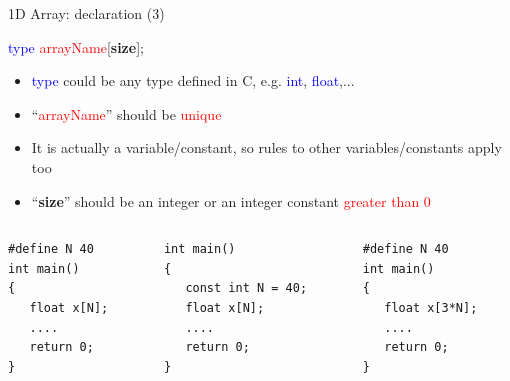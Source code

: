 \begin{frame}[fragile]{1D Array: declaration (3)}
\begin{center}
 \LARGE{
	\textcolor{blue}{type} \textcolor{red}{arrayName}[\textbf{size}];
	}
\end{center}
\begin{itemize}
	\item {\textcolor{blue}{type} could be any type defined in C, e.g. \textcolor{blue}{int}, \textcolor{blue}{float},...}
	\item {``\textcolor{red}{arrayName}'' should be \textcolor{red}{unique}}
	\item {It is actually a variable/constant, so rules to other variables/constants apply too}
	\item {``\textbf{size}'' should be an integer or an integer constant \textcolor{red}{greater than 0}}
\end{itemize}
\begin{columns}
\begin{column}{0.25\linewidth}
\begin{lstlisting}
#define N 40
int main()
{
   float x[N];
   ....
   return 0;
}

\end{lstlisting}
\end{column}
\begin{column}{0.35\linewidth}
\begin{lstlisting}
int main()
{
   const int N = 40;
   float x[N];
   ....
   return 0;
}

\end{lstlisting}
\end{column}
\begin{column}{0.3\linewidth}
\begin{lstlisting}
#define N 40
int main()
{
   float x[3*N];
   ....
   return 0;
}

\end{lstlisting}
\end{column}
\end{columns}
\end{frame}

